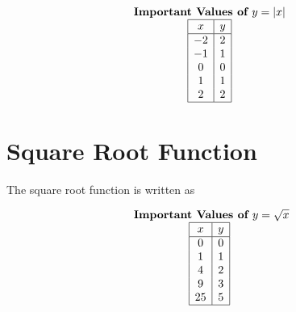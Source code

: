 \documentclass[nooutcomes]{ximera}
\begin{document}
\begin{image}
\end{image}

\[
\begin{array}{c }
\text{\textbf{Important Values of $y=|x|$}} \\
\begin{array}{|c|c|}
 \hline
 x & y\\
 \hline
 -2&2\\ 
-1&1\\ 
0&0\\
 1&1\\
 2&2\\
 \hline
\end{array}
\end{array}
\]



\newpage


\section{Square Root Function}
The square root function is written as

\begin{image}
\end{image}

\begin{image}
\end{image}


\[
\begin{array}{c }
 \text{\textbf{ Important Values of $y=\sqrt{x}$}} \\
\begin{array}{|c|c|}
 \hline
 x & y\\
 \hline
 0&0\\
 1&1\\
 4&2\\
 9&3\\
 25&5\\
 \hline
\end{array}
\end{array}
\]
\end{document}
